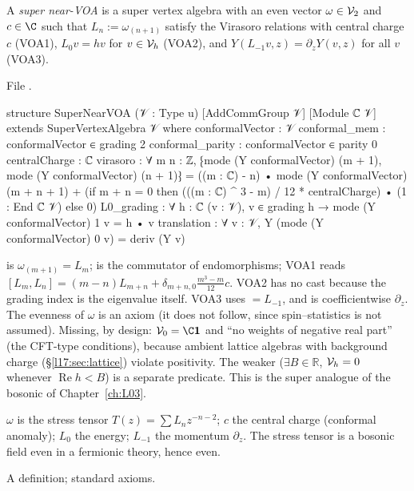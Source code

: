 \begin{definition}\label{l17:def:snvoa}
A \emph{super near-VOA} is a super vertex algebra with an even vector $\omega\in\mathcal{V}_2$ and
$c\in\C$ such that $L_n:=\omega_{(n+1)}$ satisfy the Virasoro relations with central charge $c$
(VOA1), $L_0v=hv$ for $v\in\mathcal{V}_h$ (VOA2), and $Y(L_{-1}v,z)=\partial_zY(v,z)$ for all $v$
(VOA3).
\end{definition}
\noindent File .
\begin{leancode}
structure SuperNearVOA (𝒱 : Type u) [AddCommGroup 𝒱] [Module ℂ 𝒱]
    extends SuperVertexAlgebra 𝒱 where
  conformalVector : 𝒱
  conformal_mem : conformalVector ∈ grading 2
  conformal_parity : conformalVector ∈ parity 0
  centralCharge : ℂ
  virasoro : ∀ m n : ℤ,
      ⁅mode (Y conformalVector) (m + 1), mode (Y conformalVector) (n + 1)⁆
        = ((m : ℂ) - n) • mode (Y conformalVector) (m + n + 1)
          + (if m + n = 0 then (((m : ℂ) ^ 3 - m) / 12 * centralCharge) • (1 : End ℂ 𝒱)
             else 0)
  L0_grading : ∀ {h : ℂ} (v : 𝒱), v ∈ grading h → mode (Y conformalVector) 1 v = h • v
  translation : ∀ v : 𝒱, Y (mode (Y conformalVector) 0 v) = deriv (Y v)
\end{leancode}
\begin{dictionary}
 is $\omega_{(m+1)}=L_m$;  is the commutator of
endomorphisms; VOA1 reads $[L_m,L_n]=(m-n)L_{m+n}+\delta_{m+n,0}\frac{m^3-m}{12}c$. VOA2 has no cast
because the grading index is the eigenvalue itself. VOA3 uses  $=L_{-1}$, and
 is coefficientwise $\partial_z$. The evenness of $\omega$ is an axiom (it does not follow,
since spin--statistics is not assumed). Missing, by design: $\lseventeenV_0=\C\lseventeenvac$ and
``no weights of negative real part'' (the CFT-type conditions), because ambient lattice algebras with
background charge (§\ref{l17:sec:lattice}) violate positivity. The weaker 
($\exists B\in\mathbb{R}$, $\mathcal{V}_h=0$ whenever $\operatorname{Re}h<B$) is a separate predicate. This is
the super analogue of the bosonic  of Chapter~\ref{ch:L03}.
\end{dictionary}
\begin{physics}
$\omega$ is the stress tensor $T(z)=\sum L_nz^{-n-2}$; $c$ the central charge (conformal anomaly);
$L_0$ the energy; $L_{-1}$ the momentum $\partial_z$. The stress tensor is a bosonic field even in a
fermionic theory, hence even.
\end{physics}
\begin{status}
A definition; standard axioms.
\end{status}

